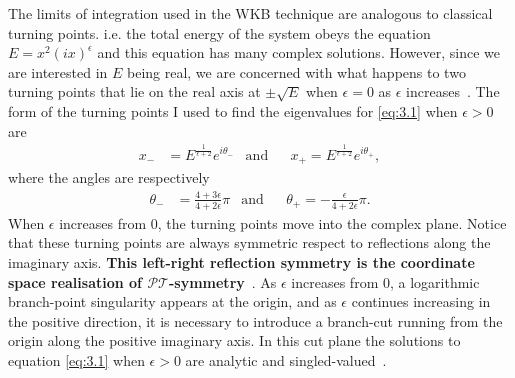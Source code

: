 \documentclass[12pt, a4paper]{report}
\newcommand\PT{\(\mathcal{PT}\)}
\begin{document}
The limits of integration used in the WKB technique are analogous to classical turning points. i.e. the total energy of the system obeys the equation $E = x^2 (ix)^{\epsilon}$ and this equation has many complex solutions. However, since we are interested in $E$ being real, we are concerned with what happens to two turning points that lie on the real axis at $\pm \sqrt{E}$ when $\epsilon = 0$ as $\epsilon$ increases~\cite{PTsymmetricQM,MakingSense}.
The form of the turning points I used to find the eigenvalues for \ref{eq:3.1} when $\epsilon>0$ are
\begin{align}
x_{-}& = 
E^{\frac{1}{\epsilon + 2}}
e^{i\theta_{-}}
&\mathrm{and}&
&x_{+} = E^{\frac{1}{\epsilon + 2}} e^{i\theta_{+}},
\end{align}
where the angles are respectively
\begin{align}
\theta_{-}& = \frac{4 + 3\epsilon}{4 + 2 \epsilon} \pi
&\mathrm{and}&
&\theta_{+} = - \frac{\epsilon}{4 + 2 \epsilon} \pi.
\end{align}
When $\epsilon$ increases from 0, the turning points move into the complex plane. Notice that these turning points are always symmetric respect to reflections along the imaginary axis. \textbf{This left-right reflection symmetry is the coordinate space realisation of \PT-symmetry}~\cite{PTsymmetricQM}.
As $\epsilon$ increases from 0, a logarithmic branch-point singularity appears at the origin, and as $\epsilon$ continues increasing in the positive direction, it is necessary to introduce a branch-cut running from the origin along the positive imaginary axis. In this cut plane the solutions to equation \ref{eq:3.1} when $\epsilon>0$ are analytic and singled-valued~\cite{PTsymmetricQM}.
\end{document}

